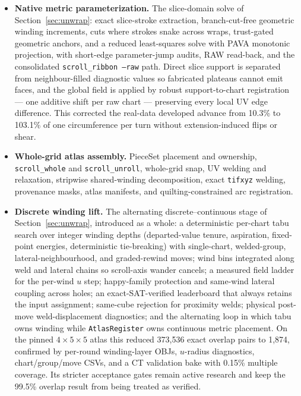 {\begin{itemize}
  \item \textbf{Native metric parameterization.} The slice-domain solve of Section~\ref{sec:unwrap}: exact slice-stroke extraction, branch-cut-free geometric winding increments, cuts where strokes snake across wraps, trust-gated geometric anchors, and a reduced least-squares solve with PAVA monotonic projection, with short-edge parameter-jump audits, RAW read-back, and the consolidated \texttt{scroll\_ribbon --raw} path. Direct slice support is separated from neighbour-filled diagnostic values so fabricated plateaus cannot emit faces, and the global field is applied by robust support-to-chart registration --- one additive shift per raw chart --- preserving every local UV edge difference. This corrected the real-data developed advance from 10.3\% to 103.1\% of one circumference per turn without extension-induced flips or shear.

  \item \textbf{Whole-grid atlas assembly.} PieceSet placement and ownership, \texttt{scroll\_whole} and \texttt{scroll\_unroll}, whole-grid snap, UV welding and relaxation, stripwise shared-winding decomposition, exact \texttt{tifxyz} welding, provenance masks, atlas manifests, and quilting-constrained arc registration.

  \item \textbf{Discrete winding lift.} The alternating discrete--continuous stage of Section~\ref{sec:unwrap}, introduced as a whole: a deterministic per-chart tabu search over integer winding depths (departed-value tenure, aspiration, fixed-point energies, deterministic tie-breaking) with single-chart, welded-group, lateral-neighbourhood, and graded-rewind moves; wind bins integrated along weld and lateral chains so scroll-axis wander cancels; a measured field ladder for the per-wind $u$ step; happy-family protection and same-wind lateral coupling across holes; an exact-SAT-verified leaderboard that always retains the input assignment; same-cube rejection for proximity welds; physical post-move weld-displacement diagnostics; and the alternating loop in which tabu owns winding while \texttt{AtlasRegister} owns continuous metric placement. On the pinned $4\times5\times5$ atlas this reduced 373,536 exact overlap pairs to 1,874, confirmed by per-round winding-layer OBJs, $u$-radius diagnostics, chart/group/move CSVs, and a CT validation bake with 0.15\% multiple coverage. Its stricter acceptance gates remain active research and keep the 99.5\% overlap result from being treated as verified.


\end{itemize}}
